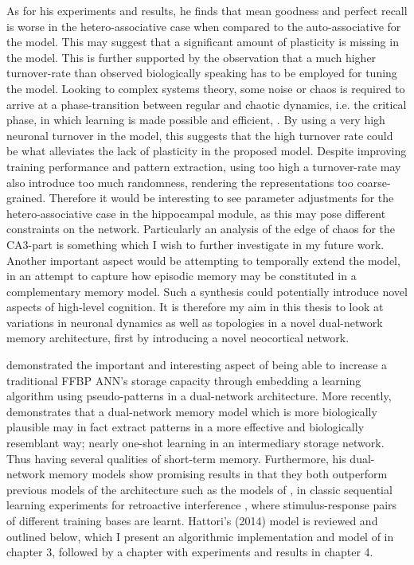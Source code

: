 As for his experiments and results, he finds that mean goodness and perfect recall is worse in the hetero-associative case when compared to the auto-associative for the model. This may suggest that a significant amount of plasticity is missing in the model. This is further supported by the observation that a much higher turnover-rate than observed biologically speaking has to be employed for tuning the model. Looking to complex systems theory, some noise or chaos is required to arrive at a phase-transition between regular and chaotic dynamics, i.e. the critical phase, in which learning is made possible and efficient, \cite{Langton1990, Newman2003}. By using a very high neuronal turnover in the model, this suggests that the high turnover rate could be what alleviates the lack of plasticity in the proposed model. Despite improving training performance and pattern extraction, using too high a turnover-rate may also introduce too much randomness, rendering the representations too coarse-grained. Therefore it would be interesting to see parameter adjustments for the hetero-associative case in the hippocampal module, as this may pose different constraints on the network. Particularly an analysis of the edge of chaos for the CA3-part is something which I wish to further investigate in my future work. Another important aspect would be attempting to temporally extend the model, in an attempt to capture how episodic memory may be constituted in a complementary memory model. Such a synthesis could potentially introduce novel aspects of high-level cognition. It is therefore my aim in this thesis to look at variations in neuronal dynamics as well as topologies in a novel dual-network memory architecture, first by introducing a novel neocortical network.


\cite{Ans1997} demonstrated the important and interesting aspect of being able to increase a traditional FFBP ANN's storage capacity through embedding a learning algorithm using pseudo-patterns in a dual-network architecture. More recently, \cite{Hattori2010, Hattori2014} demonstrates that a dual-network memory model which is more biologically plausible may in fact extract patterns in a more effective and biologically resemblant way; nearly one-shot learning in an intermediary storage network. Thus having several qualities of short-term memory. Furthermore, his dual-network memory models show promising results in that they both outperform previous models of the architecture such as the models of \citep{French1997, Ans1997}, in classic sequential learning experiments for retroactive interference \citep{McCloskey1989}, where stimulus-response pairs of different training bases are learnt.
Hattori's (2014) model is reviewed and outlined below, which I present an algorithmic implementation and model of in chapter 3, followed by a chapter with experiments and results in chapter 4.

